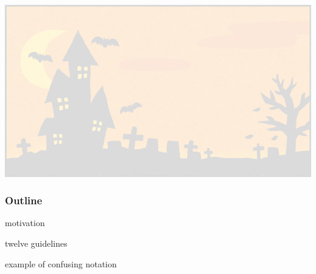 \beamertemplatenavigationsymbolsempty   %

\frame[plain]{
\titlepage
}

{\includegraphics[width=\paperwidth,height=\paperheight,keepaspectratio]{images/background-trans2.png}}



\begin{frame}
\frametitle{Outline}
\bi
  \item motivation
  \item twelve guidelines
  \item {}
  \item example of confusing notation
  \item {}
\ei
\end{frame}


